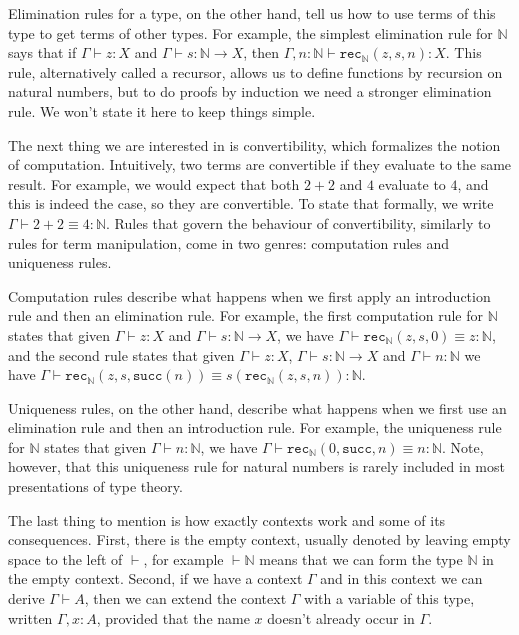 \documentclass[declaration,mgr,english,shortabstract]{iithesis}
\newcommand{\m}[1]{\texttt{#1}}
\newcommand{\type}[2]{#1 \vdash #2}
\newcommand{\term}[3]{#1 \vdash #2 : #3}
\newcommand{\termconv}[4]{#1 \vdash #2 \equiv #3 : #4}
\newcommand{\N}{\mathbb{N}}
\newcommand{\suc}[1]{\m{succ}(#1)}
\newcommand{\recN}[3]{\m{rec}_\N(#1, #2, #3)}
\begin{document}
Elimination rules for a type, on the other hand, tell us how to use terms of this type to get terms of other types. For example, the simplest elimination rule for $\N$ says that if $\term{\Gamma}{z}{X}$ and $\term{\Gamma}{s}{\N \to X}$, then $\term{\Gamma, n : \N}{\recN{z}{s}{n}}{X}$. This rule, alternatively called a recursor, allows us to define functions by recursion on natural numbers, but to do proofs by induction we need a stronger elimination rule. We won't state it here to keep things simple.

The next thing we are interested in is convertibility, which formalizes the notion of computation. Intuitively, two terms are convertible if they evaluate to the same result. For example, we would expect that both $2 + 2$ and $4$ evaluate to $4$, and this is indeed the case, so they are convertible. To state that formally, we write $\termconv{\Gamma}{2 + 2}{4}{\N}$. Rules that govern the behaviour of convertibility, similarly to rules for term manipulation, come in two genres: computation rules and uniqueness rules.

Computation rules describe what happens when we first apply an introduction rule and then an elimination rule. For example, the first computation rule for $\N$ states that given $\term{\Gamma}{z}{X}$ and $\term{\Gamma}{s}{\N \to X}$, we have $\termconv{\Gamma}{\recN{z}{s}{0}}{z}{\N}$, and the second rule states that given $\term{\Gamma}{z}{X}$, $\term{\Gamma}{s}{\N \to X}$ and $\term{\Gamma}{n}{\N}$ we have $\termconv{\Gamma}{\recN{z}{s}{\suc{n}}}{s(\recN{z}{s}{n})}{\N}$.

Uniqueness rules, on the other hand, describe what happens when we first use an elimination rule and then an introduction rule. For example, the uniqueness rule for $\N$ states that given $\term{\Gamma}{n}{\N}$, we have $\termconv{\Gamma}{\recN{0}{\m{succ}}{n}}{n}{\N}$. Note, however, that this uniqueness rule for natural numbers is rarely included in most presentations of type theory.

The last thing to mention is how exactly contexts work and some of its consequences. First, there is the empty context, usually denoted by leaving empty space to the left of $\vdash$, for example $\type{}{\N}$ means that we can form the type $\N$ in the empty context. Second, if we have a context $\Gamma$ and in this context we can derive $\Gamma \vdash A$, then we can extend the context $\Gamma$ with a variable of this type, written $\Gamma, x : A$, provided that the name $x$ doesn't already occur in $\Gamma$.
\end{document}
